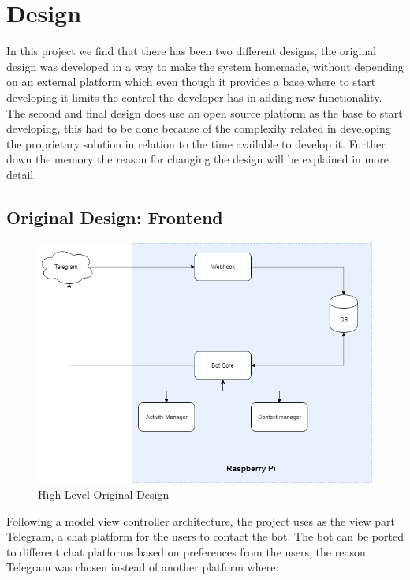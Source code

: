 \section{Design}\label{sec:chap4_design}

In this project we find that there has been two different designs, the original design was developed in a way to make the system homemade, without depending on an external platform which even though it provides a base where to start developing it limits the control the developer has in adding new functionality.\\

The second and final design does use an open source platform as the base to start developing, this had to be done because of the complexity related in developing the proprietary solution in relation to the time available to develop it. Further down the memory the reason for changing the design will be explained in more detail.

\subsection{Original Design: Frontend}\label{sec:chap4_ori_des_front}

\begin{center}
	\begin{figure}[h!]
		\centering
		\includegraphics[scale=0.5]{./images/4-original-struct}
		\caption{High Level Original Design}
		\label{4_original_struct}
	\end{figure}
\end{center}

Following a model view controller architecture, the project uses as the view part Telegram, a chat platform for the users to contact the bot. The bot can be ported to different chat platforms based on preferences from the users, the reason Telegram was chosen instead of another platform where:

